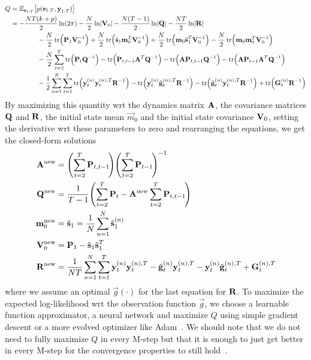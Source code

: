 	\begin{align*}
		Q
			&= \E_{\vec{s}_{1:T}}\big[ p(\vec{s}_{1:T}, \vec{y}_{1:T}) \big] \\
			&= -\frac{NT(k + p)}{2} \ln(2\pi) - \frac{N}{2} \ln \lvert \mat{V}_0 \rvert - \frac{N(T - 1)}{2} \ln \lvert \mat{Q} \rvert - \frac{NT}{2} \ln \lvert \mat{R} \rvert \\
			&\qquad\qquad -\frac{N}{2} \tr\!\Big( \mat{P}_1 \mat{V}_0^{-1} \Big) + \frac{N}{2} \tr\!\Big( \hat{\vec{s}}_1 \vec{m}_0^T \mat{V}_0^{-1} \Big) + \frac{N}{2} \tr\!\Big( \vec{m}_0 \hat{\vec{s}}_1^T \mat{V}_0^{-1} \Big) - \frac{N}{2} \tr\!\Big(\vec{m}_0 \vec{m}_0^T \mat{V}_0^{-1} \Big) \\
			&\qquad\qquad -\frac{N}{2} \sum_{t = 2}^{T} \tr\!\Big( \mat{P}_t \mat{Q}^{-1} \Big) - \tr\!\Big( \mat{P}_{t, t - 1} \mat{A}^T \mat{Q}^{-1} \Big) - \tr\!\Big( \mat{A} \mat{P}_{t, t - 1} \mat{Q}^{-1} \Big) - \tr\!\Big( \mat{A} \mat{P}_{t - 1} \mat{A}^T \mat{Q}^{-1} \Big) \\
			&\qquad\qquad -\frac{1}{2} \sum_{n = 1}^{N} \sum_{t = 1}^{T} \tr\!\Big( \vec{y}_t^{(n)} \vec{y}_t^{(n), T} \mat{R}^{-1} \Big) - \tr\!\Big( \vec{y}_t^{(n)} \hat{\vec{g}}_t^{(n), T} \mat{R}^{-1} \Big) - \tr\!\Big( \hat{\vec{g}}_t^{(n)} \vec{y}_t^{(n), T} \mat{R}^{-1} \Big) + \tr\!\Big( \mat{G}_t^{(n)} \mat{R}^{-1} \Big)
	\end{align*}
	By maximizing this quantity \ac{wrt} the dynamics matrix \(\boldsymbol{\mathrm{A}}\), the covariance matrices \(\boldsymbol{\mathrm{Q}}\) and \(\boldsymbol{\mathrm{R}}\), the initial state mean \(\vec{m}_0\) and the initial state covariance \(\boldsymbol{\mathrm{V}}_0\), \ie setting the derivative \ac{wrt} these parameters to zero and rearranging the equations, we get the closed-form solutions
	\begin{align*}
		\boldsymbol{\mathrm{A}}^{\mathrm{new}}   &= \Bigg(\! \sum_{t = 2}^{T} \boldsymbol{\mathrm{P}}_{t, t - 1} \!\Bigg) \Bigg(\! \sum_{t = 2}^{T} \boldsymbol{\mathrm{P}}_{t - 1} \!\Bigg)^{-1} \\
		\boldsymbol{\mathrm{Q}}^{\mathrm{new}}   &= \frac{1}{T - 1} \Bigg(\! \sum_{t = 2}^{T} \boldsymbol{\mathrm{P}}_t - \boldsymbol{\mathrm{A}}^{\mathrm{new}} \sum_{t = 2}^{T} \boldsymbol{\mathrm{P}}_{t, t - 1} \!\Bigg) \\
		\boldsymbol{\mathrm{m}}_0^{\mathrm{new}} &= \hat{\boldsymbol{\mathrm{s}}}_1 = \frac{1}{N} \sum_{n = 1}^{N} \hat{\boldsymbol{\mathrm{s}}}_1^{(n)} \\
		\boldsymbol{\mathrm{V}}_0^{\mathrm{new}} &= \boldsymbol{\mathrm{P}}_1 - \hat{\boldsymbol{\mathrm{s}}}_1 \hat{\boldsymbol{\mathrm{s}}}_1^T \\
		\boldsymbol{\mathrm{R}}^{\mathrm{new}}   &= \frac{1}{NT} \sum_{n = 1}^{N} \sum_{t = 1}^{T} \boldsymbol{\mathrm{y}}_t^{(n)} \boldsymbol{\mathrm{y}}_t^{(n), T} - \hat{\boldsymbol{\mathrm{g}}}_t^{(n)} \boldsymbol{\mathrm{y}}_t^{(n), T} - \boldsymbol{\mathrm{y}}_t^{(n)} \hat{\boldsymbol{\mathrm{g}}}_t^{(n), T} + \boldsymbol{\mathrm{G}}_t^{(n), T}
	\end{align*}
	where we assume an optimal \( \vec{g}(\cdot) \) for the last equation for \(\boldsymbol{\mathrm{R}}\). To maximize the expected log-likelihood \ac{wrt} the observation function \( \vec{g} \), we choose a learnable function approximator, \eg a neural network and maximize \(Q\) using simple gradient descent or a more evolved optimizer like Adam~\cite{kingmaAdamMethodStochastic2017}. We should note that we do not need to fully maximize \(Q\) in every M-step but that it is enough to just get better in every M-step for the convergence properties to still hold~\cite{dempsterMaximumLikelihoodIncomplete1977a}.

